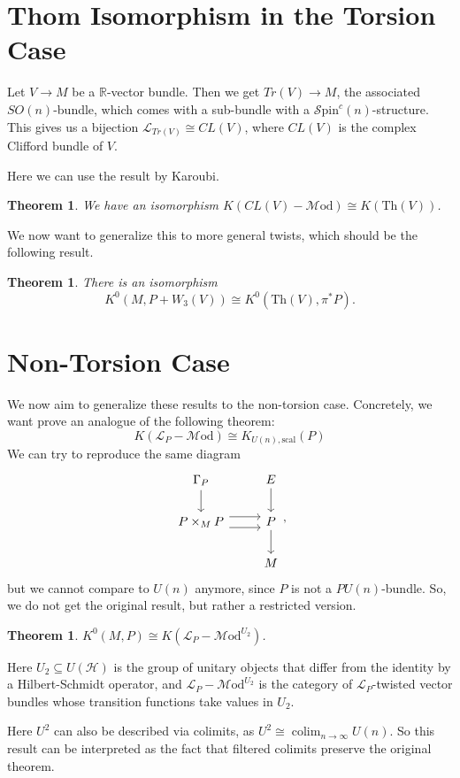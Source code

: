 \documentclass[a4paper]{book}
\newcommand{\lH}{\mathcal{H}}
\newcommand{\lL}{\mathcal{L}}
\newcommand{\lM}{\mathcal{M}}
\newcommand{\bR}{\mathbb{R}}
\newcommand{\lS}{\mathcal{S}}
\newcommand{\spin}{\lS\mathrm{pin}} %
\newcommand{\Mod}{\lM\mathrm{od}} %
\DeclareMathOperator*\colim{colim} %
\newtheorem{theorem}[equation]{Theorem}
\theoremstyle{definition}
\theoremstyle{remark}
\numberwithin{equation}{section}
\begin{document}
\section{Thom Isomorphism in the Torsion Case}
Let $V \to M$ be a $\bR$-vector bundle. Then we get $Tr(V) \to M$,	the associated $SO(n)$-bundle, which comes with a sub-bundle with a $\spin^c(n)$-structure. This gives us a bijection $\lL_{Tr(V)} \cong CL(V)$, where $CL(V)$ is the complex Clifford bundle of $V$.

Here we can use the result by Karoubi.

\begin{theorem}
	We have an isomorphism $K(CL(V)-\Mod) \cong K(\mathrm{Th}(V))$.
\end{theorem}

We now want to generalize this to more general	twists, which should be the following result.

\begin{theorem}
	There is an isomorphism
	\[K^0(M,P+W_3(V)) \cong K^0(\mathrm{Th}(V),\pi^*P). \]
\end{theorem}

\section{Non-Torsion Case}
We now aim to generalize these results to the non-torsion case. Concretely, we want prove an analogue of the following theorem:
\[K(\lL_P-\Mod) \cong K_{U(n),\mathrm{scal}}(P) \]
We can try to reproduce the same diagram 
\[ 
	\begin{tikzcd}
	 \Gamma_P \arrow[d] & E \arrow[d] \\ 
	 P \times_M P \arrow[r, shift left = 1.8] \arrow[r, shift right = 1.8] & P \arrow[d] \\ 
	 & M  
	\end{tikzcd},
	\]
	but we cannot compare to $U(n)$ anymore, since $P$ is not a $PU(n)$-bundle. So, we do not get the original result, but rather a restricted version.

	\begin{theorem}
	 $K^0(M,P) \cong K(\lL_P-\Mod^{U_2})$.
	\end{theorem}
	Here $U_2 \subseteq U(\lH)$	is the group of unitary objects that differ from the identity by a Hilbert-Schmidt operator, and $\lL_P-\Mod^{U_2}$ is the category of $\lL_P$-twisted vector bundles whose transition functions take values in $U_2$.

	Here $U^2$ can also be described via colimits, as $U^2 \cong \colim_{n \to \infty} U(n)$. So this result can be interpreted as the fact that filtered colimits preserve the original theorem.
\end{document}
